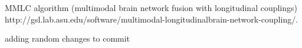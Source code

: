 MMLC algorithm (multimodal brain network 
fusion with longitudinal couplings)
http://gsl.lab.asu.edu/software/multimodal-longitudinalbrain-network-coupling/. 
\cite{Zhang2022}



adding random changes to commit


